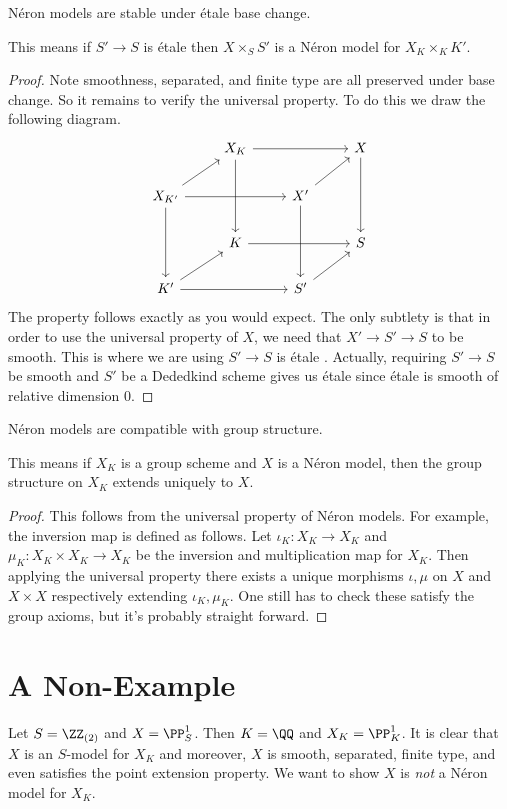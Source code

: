 \documentclass[11pt]{article}
\newcommand{\neron}{N\'{e}ron }
\newcommand{\etale}{\'{e}tale }
\begin{document}
\begin{prop}
	\neron models are stable under \etale base change.
	
	This means if $S' \to S$ is \etale then $X\times_S S'$ is a \neron model for $X_K\times_K K'$.
\end{prop}
\begin{proof}
	Note smoothness, separated, and finite type are all preserved under base change. So it remains to verify the universal property. To do this we draw the following diagram.
	$$
	\begin{tikzcd}
		\, & X_K \ar{rr}\ar{dd} & & X \ar{dd}
		\\
		X_{K'} \ar{rr}\ar{dd}\ar{ur} & & X' \ar{dd}\ar{ur}
		\\
		\, & K \ar{rr} & & S
		\\
		K' \ar{rr}\ar{ur} & & S' \ar{ur}
	\end{tikzcd}
	$$
	The property follows exactly as you would expect. The only subtlety is that in order to use the universal property of $X$, we need that $X' \to S' \to S$ to be smooth. This is where we are using $S' \to S$ is \etale. Actually, requiring $S' \to S$ be smooth and $S'$ be a Dededkind scheme gives us \etale since \etale is smooth of relative dimension $0$.
\end{proof}

\begin{prop}
	\neron models are compatible with group structure.

	This means if $X_K$ is a group scheme and $X$ is a \neron model, then the group structure on $X_K$ extends uniquely to $X$.
\end{prop}
\begin{proof}
	This follows from the universal property of \neron models. For example, the inversion map is defined as follows. Let $\iota_K:X_K \to X_K$ and $\mu_K:X_K\times X_K \to X_K$ be the inversion and multiplication map for $X_K$. Then applying the universal property there exists a unique morphisms $\iota,\mu$ on $X$ and $X\times X$ respectively extending $\iota_K,\mu_K$. One still has to check these satisfy the group axioms, but it's probably straight forward.
\end{proof}

\section{A Non-Example}

Let $S = \ZZ_{(2)}$ and $X = \PP^1_S$. Then $K = \QQ$ and $X_K = \PP^1_K$. It is clear that $X$ is an $S$-model for $X_K$ and moreover, $X$ is smooth, separated, finite type, and even satisfies the point extension property. We want to show $X$ is \emph{not} a \neron model for $X_K$.
\end{document}
